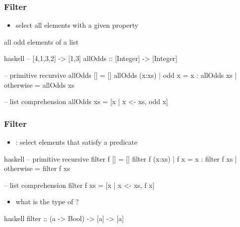 \documentclass[dvipsnames]{beamer}
\theoremstyle{plain}
\begin{document}
\begin{frame}[fragile]
  \frametitle{Filter}

  \begin{itemize}
    \item select all elements with a given property
  \end{itemize}

  \begin{exampleblock}{all odd elements of a list}
    \begin{pygments}{haskell}
-- [4,1,3,2] -> [1,3]
allOdds :: [Integer] -> [Integer]

-- primitive recursive
allOdds []     = []
allOdds (x:xs)
  | odd x      = x : allOdds xs
  | otherwise  = allOdds xs

-- list comprehension
allOdds xs = [x | x <- xs, odd x]
    \end{pygments}
  \end{exampleblock}
\end{frame}

\begin{frame}[fragile]
  \frametitle{Filter}

  \begin{itemize}
    \item {}: select elements that satisfy a predicate
  \end{itemize}

  \begin{exampleblock}{}
    \begin{pygments}{haskell}
-- primitive recursive
filter f []     = []
filter f (x:xs)
  | f x       = x : filter f xs
  | otherwise = filter f xs

-- list comprehension
filter f xs = [x | x <- xs, f x]
    \end{pygments}
  \end{exampleblock}

  \pause
  \begin{itemize}
    \item what is the type of ?
  \end{itemize}

  \begin{pygments}{haskell}
filter :: (a -> Bool) -> [a] -> [a]
  \end{pygments}
\end{frame}
\end{document}
